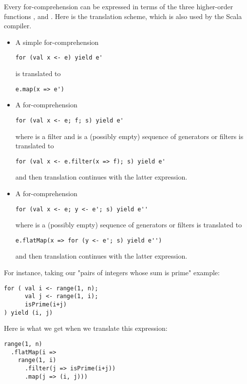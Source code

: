 Every for-comprehension can be expressed in terms of the three
higher-order functions ,  and .
Here is the translation scheme, which is also used by the Scala compiler.
\begin{itemize}
\item
A simple for-comprehension
\begin{lstlisting}
for (val x <- e) yield e'
\end{lstlisting}
is translated to
\begin{lstlisting}
e.map(x => e')
\end{lstlisting}
\item
A for-comprehension
\begin{lstlisting}
for (val x <- e; f; s) yield e'
\end{lstlisting}
where  is a filter and  is a (possibly empty)
sequence of generators or filters
is translated to
\begin{lstlisting}
for (val x <- e.filter(x => f); s) yield e'
\end{lstlisting}
and then translation continues with the latter expression.
\item
A for-comprehension
\begin{lstlisting}
for (val x <- e; y <- e'; s) yield e''
\end{lstlisting}
where  is a (possibly empty)
sequence of generators or filters
is translated to
\begin{lstlisting}
e.flatMap(x => for (y <- e'; s) yield e'')
\end{lstlisting}
and then translation continues with the latter expression.
\end{itemize}
For instance, taking our "pairs of integers whose sum is prime" example:
\begin{lstlisting}
for ( val i <- range(1, n);
      val j <- range(1, i);
      isPrime(i+j)
) yield (i, j)
\end{lstlisting}
Here is what we get when we translate this expression:
\begin{lstlisting}
range(1, n)
  .flatMap(i =>
    range(1, i)
      .filter(j => isPrime(i+j))
      .map(j => (i, j)))
\end{lstlisting}

